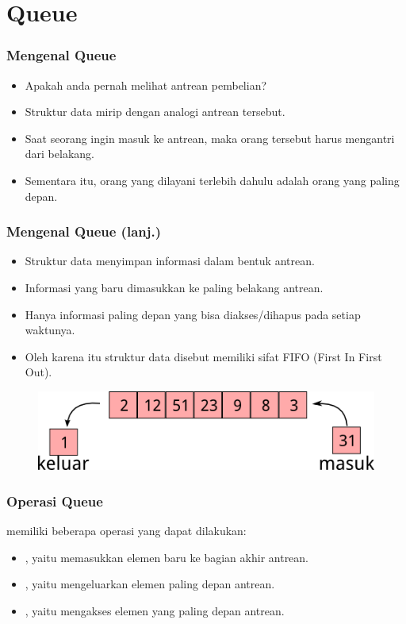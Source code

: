 \section{Queue}
\frame{\sectionpage}

\begin{frame}
\frametitle{Mengenal Queue}
\begin{itemize}
  \item Apakah anda pernah melihat antrean pembelian?
  \item Struktur data  mirip dengan analogi antrean tersebut.
  \item Saat seorang ingin masuk ke antrean, maka orang tersebut harus mengantri dari belakang. \item Sementara itu, orang yang dilayani terlebih dahulu adalah orang yang paling depan.
\end{itemize}
\end{frame}

\begin{frame}
\frametitle{Mengenal Queue (lanj.)}
\begin{itemize}
  \item Struktur data  menyimpan informasi dalam bentuk antrean.
  \item Informasi yang baru dimasukkan ke paling belakang antrean.
  \item Hanya informasi paling depan yang bisa diakses/dihapus pada setiap waktunya.
  \item Oleh karena itu struktur data  disebut memiliki sifat FIFO (First In First Out).
\end{itemize}

\begin{figure}
  \centering
  \includegraphics[width=7 cm]{asset/queue.png}
\end{figure}
\end{frame}

\begin{frame}
\frametitle{Operasi Queue}

 memiliki beberapa operasi yang dapat dilakukan:
\begin{itemize}
  \item {}, yaitu memasukkan elemen baru ke bagian akhir antrean.
  \item {}, yaitu mengeluarkan elemen paling depan antrean.
  \item {}, yaitu mengakses elemen yang paling depan antrean.
\end{itemize}
\end{frame}

